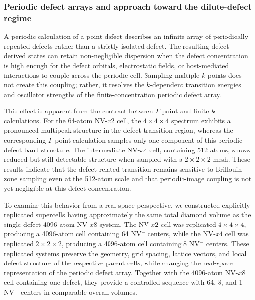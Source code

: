 \subsubsection{Periodic defect arrays and approach toward the dilute-defect regime}

A periodic calculation of a point defect describes an infinite array of
periodically repeated defects rather than a strictly isolated defect.
The resulting defect-derived states can retain non-negligible
dispersion when the defect concentration is high enough for the defect
orbitals, electrostatic fields, or host-mediated interactions to couple
across the periodic cell.  Sampling multiple $k$ points does not create
this coupling; rather, it resolves the $k$-dependent transition
energies and oscillator strengths of the finite-concentration periodic
defect array.

This effect is apparent from the contrast between $\Gamma$-point and
finite-$k$ calculations.  For the 64-atom NV-$x2$ cell, the
$4 \times 4 \times 4$ spectrum exhibits a pronounced multipeak
structure in the defect-transition region, whereas the corresponding
$\Gamma$-point calculation samples only one component of this
periodic-defect band structure.  The intermediate NV-$x4$ cell,
containing 512 atoms, shows reduced but still detectable structure
when sampled with a $2 \times 2 \times 2$ mesh.  These results indicate
that the defect-related transition remains sensitive to Brillouin-zone
sampling even at the 512-atom scale and that periodic-image coupling is
not yet negligible at this defect concentration.

To examine this behavior from a real-space perspective, we constructed
explicitly replicated supercells having approximately the same total
diamond volume as the single-defect 4096-atom NV-$x8$ system.  The
NV-$x2$ cell was replicated $4 \times 4 \times 4$, producing a
4096-atom cell containing 64 NV$^-$ centers, while the NV-$x4$ cell was
replicated $2 \times 2 \times 2$, producing a 4096-atom cell containing
8 NV$^-$ centers.  These replicated systems preserve the geometry,
grid spacing, lattice vectors, and local defect structure of the
respective parent cells, while changing the real-space representation
of the periodic defect array.  Together with the 4096-atom NV-$x8$
cell containing one defect, they provide a controlled sequence with
64, 8, and 1 NV$^-$ centers in comparable overall volumes.

